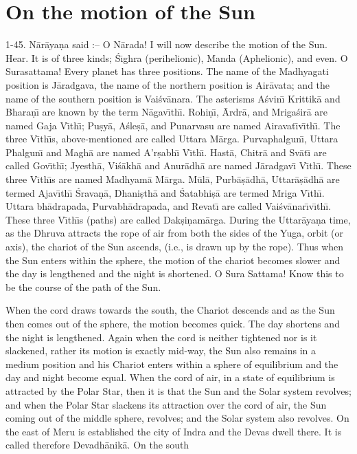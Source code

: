 \chapter{On the motion of the Sun}

1-45. N\=ar\=aya\d{n}a said :-- O N\=arada! I will now describe the motion of the Sun. Hear. It is of three kinds; \'S\={\i}ghra (perihelionic), Manda (Aphelionic), and even. O Surasattama! Every planet has three positions. The name of the Madhyagati position is J\=aradgava, the name of the northern position is Air\=avata; and the name of the southern position is Vai\'sv\=anara. The asterisms A\'svin\={\i} Krittik\=a and Bhara\d{n}\={\i} are known by the term N\=agav\={\i}th\={\i}. Rohi\d{n}\={\i}, \=Ardr\=a, and Mriga\'sir\=a are named Gaja V\={\i}th\={\i}; Pu\d{s}y\=a, A\'sle\d{s}\=a, and Punarvasu are named Airavat\={\i}v\={\i}th\={\i}. The three V\={\i}th\={\i}s, above-mentioned are called Uttara M\=arga. Purvaphalgun\={\i}, Uttara Phalgun\={\i} and Magh\=a are named A'r\d{s}abh\={\i} V\={\i}th\={\i}. Hast\=a, Chitr\=a and Sv\=at\={\i} are called Gov\={\i}th\={\i}; Jyesth\=a, Vi\'s\=akh\=a and Anur\=adh\=a are named J\=aradgav\={\i} V\={\i}th\={\i}. These three V\={\i}th\={\i}s are named Madhyam\=a M\=arga. M\=ul\=a, Purb\=a\d{s}\=adh\=a, Uttar\=a\d{s}\=adh\=a are termed Ajav\={\i}th\={\i} \'Srava\d{n}\=a, Dhani\d{s}th\=a and \'Satabhi\d{s}\=a are termed Mriga V\={\i}th\={\i}. Uttara bh\=adrapada, Purvabh\=adrapada, and Revat\={\i} are called Vai\'sv\=anar\={\i}v\={\i}th\={\i}. These three V\={\i}th\={\i}s (paths) are called Dak\d{s}i\d{n}am\=arga. During the Uttar\=aya\d{n}a time, as the Dhruva attracts the rope of air from both the sides of the Yuga, orbit (or axis), the chariot of the Sun ascends, (i.e., is drawn up by the rope). Thus when the Sun enters within the sphere, the motion of the chariot becomes slower and the day is lengthened and the night is shortened. O Sura Sattama! Know this to be the course of the path of the Sun.

When the cord draws towards the south, the Chariot descends and as the Sun then comes out of the sphere, the motion becomes quick. The day shortens and the night is lengthened. Again when the cord is neither tightened nor is it slackened, rather its motion is exactly mid-way, the Sun also remains in a medium position and his Chariot enters within a sphere of equilibrium and the day and night become equal. When the cord of air, in a state of equilibrium is attracted by the Polar Star, then it is that the Sun and the Solar system revolves; and when the Polar Star slackens its attraction over the cord of air, the Sun coming out of the middle sphere, revolves; and the Solar system also revolves. On the east of Meru is established the city of Indra and the Devas dwell there. It is called therefore Devadh\=anik\=a. On the south

